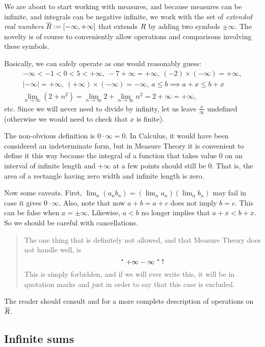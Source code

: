 \documentclass[
]{book}
\newcommand{\oR}{\overline{\R}}
\let\mathbb\relax %
\newcommand{\R}{\mathbb{R}}
\renewcommand*{\leq}{\leqslant}
\theoremstyle{definition}
\theoremstyle{definition}
\theoremstyle{definition}
\theoremstyle{definition}
\theoremstyle{remark}
\begin{document}
We are about to start working with measures, and because measures can be
infinite, and integrals can be negative infinite, we work with the set
of \emph{extended real numbers} \(\oR := [-\infty,+\infty]\) that extends \(\R\)
by adding two symbols \(\pm \infty\). The novelty is of course to
conveniently allow operations and comparisons involving these symbols.

Basically, we can safely operate as one would reasonably guess:
\[\begin{gathered}
-\infty < -1 < 0 < 5 < +\infty,
\
-7 +\infty = +\infty,
\
(-2) \times (-\infty) = +\infty,
\\
|-\infty| = +\infty,
\
(+\infty) \times (-\infty) = -\infty,
\
a \leq b \implies a+x \leq b+x
\\
\lim_{n\to\infty} (2+n^2)
=
\lim_{n\to\infty} 2
+
\lim_{n\to\infty} n^2
=
2 + \infty
=
+\infty,\end{gathered}\] etc. Since we will never need to divide by
infinity, let us leave \(\frac{x}{\infty}\) undefined (otherwise we would
need to check that \(x\) is finite).

The non-obvious definition is \(0 \cdot \infty = 0\). In Calculus, it
would have been considered an indeterminate form, but in Measure Theory
it is convenient to define it this way because the integral of a
function that takes value \(0\) on an interval of infinite length and
\(+\infty\) at a few points should still be \(0\). That is, the area of a
rectangle having zero width and infinite length is zero.

Now some caveats. First, \(\lim_n (a_n b_n) = (\lim_n a_n)(\lim_n b_n)\)
may fail in case it gives \(0 \cdot \infty\). Also, note that now
\(a+b = a+c\) does not imply \(b=c\). This can be false when \(a=\pm \infty\).
Likewise, \(a<b\) no longer implies that \(a+x < b+x\). So we should be
careful with cancellations.

\begin{quote}
The one thing that is definitely not allowed, and that Measure Theory
does not handle well, is \[\text{" $ +\infty -\infty $ " !}\] This is
simply forbidden, and if we will ever write this, it will be in
quotation marks and just in order to say that this case is excluded.
\end{quote}

The reader should consult \citep[ §§B.4--B.6]{Cohn13} and \citep[ p.~xi]{Tao11} for a
more complete description of operations on \(\oR\).

\hypertarget{infinite-sums}{%
\subsection{Infinite sums}\label{infinite-sums}}
\end{document}
